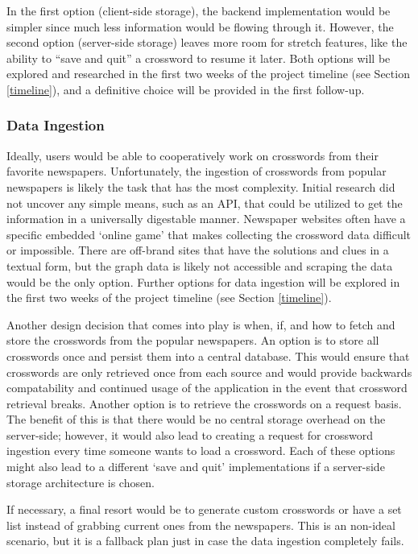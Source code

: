 \documentclass{article}
\begin{document}
In the first option (client-side storage), the backend implementation would be simpler since much less information
would be flowing through it. However, the second option (server-side storage) leaves more room
for stretch features, like the ability to ``save and quit'' a crossword to resume it later.
Both options will be explored and researched in the first two weeks of the project timeline (see Section \ref{timeline}), and a definitive choice will be provided in the first follow-up.

\subsubsection{Data Ingestion}
\label{ingestarch}
Ideally, users would be able to cooperatively work on crosswords from their favorite newspapers.
Unfortunately, the ingestion of crosswords from popular newspapers is likely the task that has the most complexity. Initial
research did not uncover any simple means, such as an API, that could be utilized to get the information in
a universally digestable manner.  Newspaper websites often have a specific embedded `online game' that makes collecting
the crossword data difficult or impossible. There are off-brand sites that have the solutions and clues in a textual form,
but the graph data is likely not accessible and scraping the data would be the only option.
Further options for data ingestion will be explored in the first two weeks of the project timeline
(see Section \ref{timeline}).

Another design decision that comes into play is when, if, and how to fetch and store the crosswords from
the popular newspapers. An option is to store all crosswords once and persist them into a central database. This would
ensure that crosswords are only retrieved once from each source and would provide backwards compatability and continued
usage of the application in the event that crossword retrieval breaks. Another option is to retrieve the
crosswords on a request basis. The benefit of this is that there would be no central storage overhead on the server-side; however, it would also lead to creating a request for crossword ingestion every time someone wants to load a crossword.
Each of these options might also lead to a different `save and quit' implementations if a server-side storage architecture
is chosen.

If necessary, a final resort would be to generate custom crosswords or have a set list
instead of grabbing current ones from the newspapers. This is an non-ideal scenario, but it is a fallback plan just in
case the data ingestion completely fails.
\end{document}
